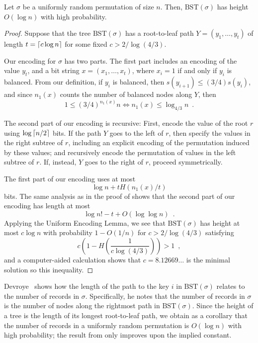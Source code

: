 \documentclass{patmorin}
\newcommand{\aremark}[3]{\textcolor{blue}{\textsc{#1 #2:}}
  \textcolor{red}{\textsf{#3}}}
\newcommand{\wolfgang}[2][says]{\aremark{Wolfgang}{#1}{#2}}
\begin{document}

\begin{thm}
  Let $\sigma$ be a uniformly random permutation of size $n$. Then,
  $\text{BST}(\sigma)$ has height $O(\log n)$ with high probability.
\end{thm}
\begin{proof}
  Suppose that the tree $\text{BST}(\sigma)$ has a root-to-leaf path
  $Y = (y_1, \ldots, y_t)$ of length $t = {\lceil c \log n \rceil}$ for some
  fixed $c > 2/\log (4/3)$.

  Our encoding for $\sigma$ has two parts. The first part includes an
  encoding of the value $y_t$, and a bit string
  $x = (x_1, \ldots, x_t)$, where $x_i = 1$ if and only if $y_i$ is
  balanced. From our definition, if $y_i$ is balanced, then
  $s(y_{i + 1}) \leq (3/4) s(y_i)$, and since $n_1(x)$ counts the
  number of balanced nodes along $Y$, then
  \[
    1 \leq (3/4)^{n_1(x)} n \iff n_1(x) \leq \log_{4/3} n \enspace .
  \]

  The second part of our encoding is recursive: First, encode the
  value of the root $r$ using $\log {\lceil n/2 \rceil}$ bits. If the
  path $Y$ goes to the left of $r$, then specify the values in the
  right subtree of $r$, including an explicit encoding of the
  permutation induced by these values; and recursively encode the
  permutation of values in the left subtree of $r$. If, instead, $Y$
  goes to the right of $r$, proceed symmetrically.
 
  The first part of our encoding uses at most
  \[
    \log n + t H(n_1(x)/t)
  \]
  bits. The same analysis as in the proof of  shows that
  the second part of our encoding has length at most
  \[
    \log n! - t + O(\log \log n) \enspace .
  \]
  Applying the Uniform Encoding Lemma, we see that
  $\text{BST}(\sigma)$ has height at most $c \log n$ with probability
  $1 - O(1/n)$ for $c > 2/\log (4/3)$ satisfying
  \[
    c \left(1 - H\left(\frac{1}{c \log (4/3)}\right)\right) > 1 \enspace ,
  \]
  and a computer-aided calculation shows that $c = 8.12669\dots$ is the
  minimal solution so this inequality.
\end{proof}

\begin{rem}
  Devroye~\cite{devroye:records} shows how the length of the path to
  the key $i$ in $\text{BST}(\sigma)$ relates to the number of records
  in $\sigma$. Specifically, he notes that the number of records in
  $\sigma$ is the number of nodes along the rightmost path in
  $\text{BST}(\sigma)$. Since the height of a tree is the length of
  its longest root-to-leaf path, we obtain as a corollary that the
  number of records in a uniformly random permutation is $O(\log n)$
  with high probability; the result from  only
  improves upon the implied constant.
\end{rem}
\end{document}
